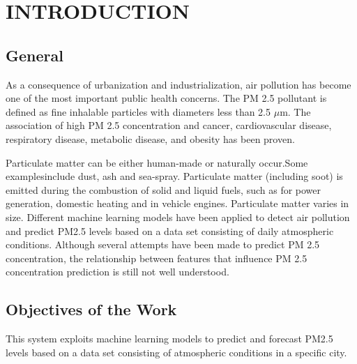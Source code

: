 %       
%
\tableofcontents
{}
\listoffigures
\mainmatter


\chapter {INTRODUCTION}
	
\section{General}    %
As a consequence of urbanization and
industrialization, air pollution has become one of
the most important public health concerns. The
PM 2.5 pollutant is defined as fine inhalable
particles with diameters less than 2.5 $\mu$m. The
association of high PM 2.5 concentration and
cancer, cardiovascular disease, respiratory
disease, metabolic disease, and obesity has been
proven.
\par Particulate matter can be either
human-made or naturally occur.Some examplesinclude dust, ash and sea-spray. Particulate matter
(including soot) is emitted during the combustion
of solid and liquid fuels, such as for power
generation, domestic heating and in vehicle
engines. Particulate matter varies in size.
Different machine learning models have been
applied to detect air pollution and predict PM2.5
levels based on a data set consisting of daily
atmospheric conditions. Although several
attempts have been made to predict PM 2.5
concentration, the relationship between features
that influence PM 2.5 concentration prediction is
still not well understood.


\section{Objectives of the Work}
This system exploits machine learning models
to predict and forecast PM2.5 levels based on a
data set consisting of atmospheric conditions in a
specific city. \pagebreak \linebreak

